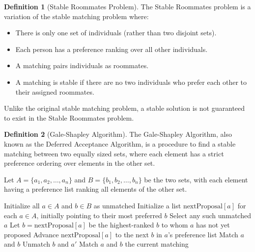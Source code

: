 \documentclass{article}
\theoremstyle{definition}
\newtheorem{definition}{Definition}
\begin{document}
\begin{definition}[Stable Roommates Problem]
The Stable Roommates problem is a variation of the stable matching problem where:
\begin{itemize}
  \item There is only one set of individuals (rather than two disjoint sets).
  \item Each person has a preference ranking over all other individuals.
  \item A matching pairs individuals as roommates.
  \item A matching is stable if there are no two individuals who prefer each other to their assigned roommates.
\end{itemize}
Unlike the original stable matching problem, a stable solution is not guaranteed to exist in the Stable Roommates problem.
\end{definition}

\begin{definition}[Gale-Shapley Algorithm]
The Gale-Shapley Algorithm, also known as the Deferred Acceptance Algorithm, is a procedure to find a stable matching between two equally sized sets, where each element has a strict preference ordering over elements in the other set.

Let $A = \{a_1, a_2, \ldots, a_n\}$ and $B = \{b_1, b_2, \ldots, b_n\}$ be the two sets, with each element having a preference list ranking all elements of the other set.
\end{definition}

\begin{algorithm}
\caption{Gale-Shapley Algorithm}
\begin{algorithmic}[1]
    \State Initialize all $a \in A$ and $b \in B$ as unmatched
    \State Initialize a list $\text{nextProposal}[a]$ for each $a \in A$, initially pointing to their most preferred $b$
        \State Select any such unmatched $a$
        \State Let $b = \text{nextProposal}[a]$ be the highest-ranked $b$ to whom $a$ has not yet proposed
        \State Advance $\text{nextProposal}[a]$ to the next $b$ in $a$'s preference list
            \State Match $a$ and $b$
            \State Unmatch $b$ and $a'$
            \State Match $a$ and $b$
        \EndIf
    \EndWhile
    \State \Return the current matching
\EndProcedure
\end{algorithmic}
\end{algorithm}
\end{document}

